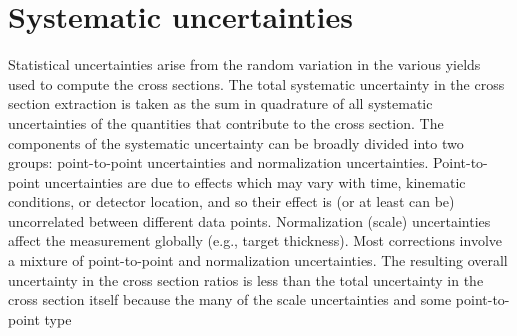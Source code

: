 \section{Systematic uncertainties}\label{syst.sec}

Statistical uncertainties arise from the random variation in the various
yields used to compute the cross sections. The total systematic uncertainty in
the cross section extraction is taken as the sum in quadrature of all
systematic uncertainties of the quantities that contribute to the cross
section. The components of the systematic uncertainty can be broadly divided
into two groups: point-to-point uncertainties and normalization uncertainties.
Point-to-point uncertainties are due to effects which may vary with time,
kinematic conditions, or detector location, and so their effect is 
(or at least can be) uncorrelated between different data points. Normalization
(scale) uncertainties affect the measurement globally (e.g., target
thickness).  Most corrections involve a mixture of point-to-point and
normalization uncertainties. The resulting overall uncertainty in the cross
section ratios is less than the total uncertainty in the cross section itself
because the many of the scale uncertainties and some point-to-point type
